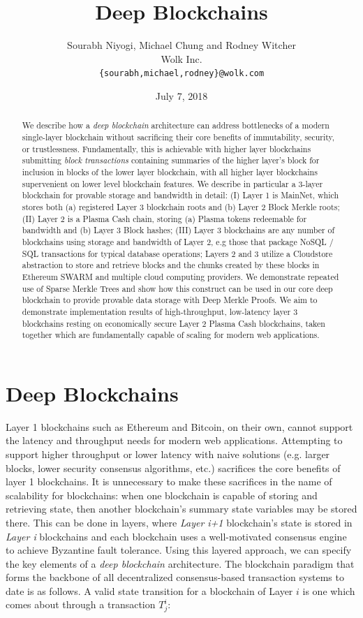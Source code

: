 \documentclass{article}
\title{Deep Blockchains}
\author{Sourabh Niyogi, Michael Chung and Rodney Witcher\\Wolk Inc.\\
{\tt \{sourabh,michael,rodney\}@wolk.com}}
\date{July 7, 2018}
\newcommand{\transaction}[2]{T_{#2}^#1}
\begin{document}
\maketitle

\begin{abstract}
We describe how a {\em deep blockchain} architecture can address bottlenecks of a modern single-layer blockchain without sacrificing their core benefits of immutability, security, or trustlessness.  Fundamentally, this is achievable with higher layer blockchains submitting {\em block transactions} containing summaries of the higher layer's block for inclusion in blocks of the lower layer blockchain, with all higher layer blockchains supervenient on lower level blockchain features.   We describe in particular a 3-layer blockchain for provable storage and bandwidth in detail: (I) Layer 1 is MainNet, which stores both (a) registered Layer 3 blockchain roots and (b) Layer 2 Block Merkle roots; (II) Layer 2 is a Plasma Cash chain, storing (a) Plasma tokens redeemable for bandwidth and (b) Layer 3 Block hashes; (III) Layer 3 blockchains are any number of blockchains using storage and bandwidth of Layer 2, e.g those that package NoSQL / SQL transactions for typical database operations;  Layers 2 and 3 utilize a Cloudstore abstraction to store and retrieve blocks and the chunks created by these blocks in Ethereum SWARM and multiple cloud computing providers.  We demonstrate repeated use of Sparse Merkle Trees and show how this construct can be used in our core deep blockchain to provide provable data storage with Deep Merkle Proofs.  We aim to demonstrate implementation results of high-throughput, low-latency layer 3 blockchains resting on  economically secure Layer 2 Plasma Cash blockchains, taken together which are fundamentally capable of scaling for modern web applications.
\end{abstract}

\section{Deep Blockchains}

Layer 1 blockchains such as Ethereum and Bitcoin, on their own, cannot support the latency and throughput needs for modern web applications.  Attempting to support higher throughput or lower latency with naive solutions (e.g. larger blocks, lower security consensus algorithms, etc.) sacrifices the core benefits of layer 1 blockchains.   It is unnecessary to make these sacrifices in the name of scalability for blockchains:  when one blockchain is capable of storing and retrieving state, then another blockchain's summary state variables may be stored there.  This can be done in layers, where {\em Layer i+1} blockchain's state is stored in {\em Layer i} blockchains and each blockchain uses a well-motivated consensus engine to achieve Byzantine fault tolerance.
Using this layered approach, we can specify the key elements of a {\em deep blockchain} architecture.  The blockchain paradigm \cite{wood2015} that forms the backbone of all decentralized consensus-based transaction systems to date is as follows. A valid state transition for a blockchain of Layer $i$ is one which comes about through a transaction $\transaction{i}{j}$:
\end{document}
